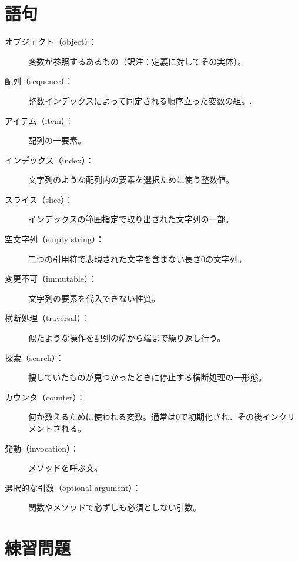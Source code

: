 \documentclass[a4j,12pt,makeidx]{jbook}
\begin{document}
\section{語句}
\begin{description}

\item[オブジェクト（object）：] 変数が参照するあるもの（訳注：定義に対してその実体）。

\item[配列（sequence）：] 整数インデックスによって同定される順序立った変数の組。.

\item[アイテム（item）：] 配列の一要素。

\item[インデックス（index）：] 文字列のような配列内の要素を選択ために使う整数値。

\item[スライス（slice）：] インデックスの範囲指定で取り出された文字列の一部。

\item[空文字列（empty string）：] 二つの引用符で表現された文字を含まない長さ0の文字列。

\item[変更不可（immutable）：] 文字列の要素を代入できない性質。

\item[横断処理（traversal）：] 似たような操作を配列の端から端まで繰り返し行う。

\item[探索（search）：] 捜していたものが見つかったときに停止する横断処理の一形態。

\item[カウンタ（counter）：] 何か数えるために使われる変数。通常は0で初期化され、その後インクリメントされる。

\item[発動（invocation）：] メソッドを呼ぶ文。

\item[選択的な引数（optional argument）：] 関数やメソッドで必ずしも必須としない引数。

\end{description}
%
\section{練習問題}
\end{document}
